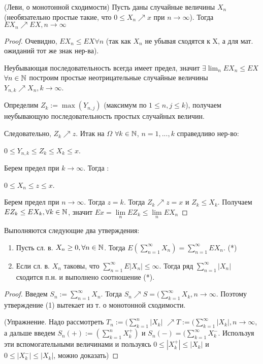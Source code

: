 	\begin{theorem}\label{lect8:th2}
	(Леви, о монотонной сходимости)
	Пусть даны случайные величины $X_n$ (необязательно простые такие, что $0 \leq X_n \nearrow x$ при $n \rightarrow \infty$). Тогда $EX_n \nearrow EX, n \rightarrow \infty$ 
	\end{theorem}
	\begin{proof}
		Очевидно, $EX_n \leq EX \forall n$ (так как $X_n$ не убывая сходятся к X, а для мат. ожиданий тот же знак нер-ва).
		 
		Неубывающая последовательность всегда имеет предел, значит $\exists \lim_{n} EX_n \leq EX$ 
		$\forall n \in \mathbb{N}$ построим простые неотрицательные случайные величины $Y_{n,k} \nearrow X_n, k \rightarrow \infty$.
		 
		Определим $Z_k :=\max(Y_{n,j}) $ (максимум по $1 \le n,j \le k$), получаем неубывающую последовательность простых случайных величин.
		 
		Следовательно, $Z_k \nearrow z$. 
		Итак на $\Omega$ $\forall k \in \mathbb{N}$, $n = 1,...,k$ справедливо нер-во:
		 
		$0 \le Y_{n,k} \le Z_k \le X_k \le x$. 
		 
		Берем предел при $k \rightarrow \infty$. Тогда :
		 
		$0 \le X_n \le z \le x$.
		 
		Берем предел при $n \rightarrow \infty$. Тогда $z = k$.
		Тогда $Z_k \nearrow z = x$ и $Z_k \le X_k$. Получаем $EZ_k \le EX_k, \forall k \in \mathbb{N}$, значит $Ex =\lim\limits_{n} EZ_k \le \lim\limits_{n} EX_n $ 
	\end{proof}
	\begin{col}\label{lect8:col1} Выполняются следующие два утверждения: 
		\begin{enumerate}
		\item Пусть сл. в. $X_n \ge 0, \forall n \in \mathbb{N}$. Тогда $E(\sum\limits_{n = 1}^{\infty} X_n) = \sum\limits_{n =1}^{\infty} EX_n$.      (*)
		\item Если сл. в. $X_n$ таковы, что $\sum\limits_{n = 1}^{\infty} E|X_n| \le \infty$. Тогда ряд $\sum\limits_{n = 1}^{\infty} |X_n|$ сходится п.н. и выполнено соотношение (*).
		\end{enumerate}
	\end{col}
	\begin{proof}
		\item Введем $S_n := \sum\limits_{n = 1}^{\infty} X_n $. Тогда $S_n \nearrow S = (\sum\limits_{k = 1}^{\infty} X_k, n \rightarrow \infty$. Поэтому утверждение (1) вытекает из т. о монотонной сходимости.
		\item  (Упражнение. Надо рассмотреть $T_n := (\sum\limits_{k = 1}^{n} |X_k|$  $\nearrow T := (\sum\limits_{k = 1}^{\infty} |X_k|, n \rightarrow \infty $, а дальше введем $S_n(+) := (\sum\limits_{k = 1}^{n} X_k^+)$ и $S_n(-) = (\sum\limits_{k = 1}^{\infty} X_k^-$. Используя эти вспомогательными величинами и пользуясь $0 \le |X_k^+| \le |X_k|$ и $0 \le |X_k^-| \le |X_k|$, можно доказать)
	\end{proof}	
	
